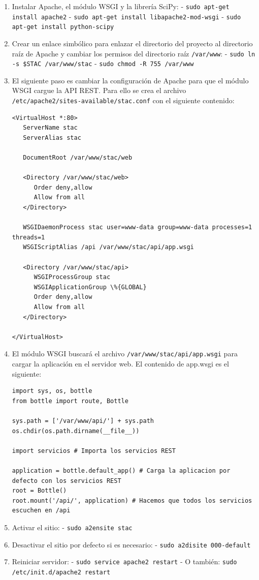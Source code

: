 \begin{enumerate}
\item Instalar Apache, el módulo WSGI y la librería SciPy:
\subitem - \texttt{sudo apt-get install apache2}
\subitem - \texttt{sudo apt-get install libapache2-mod-wsgi}
\subitem - \texttt{sudo apt-get install python-scipy}
\item Crear un enlace simbólico para enlazar el directorio del proyecto al directorio raíz de Apache y cambiar los permisos del directorio raíz \texttt{/var/www}:
\subitem - \texttt{sudo ln -s \$STAC /var/www/stac}
\subitem - \texttt{sudo chmod -R 755 /var/www}
\item El siguiente paso es cambiar la configuración de Apache para que el módulo WSGI cargue la API REST. Para ello se crea el archivo \texttt{/etc/apache2/sites-available/stac.conf} con el siguiente contenido:
\begin{lstlisting}
<VirtualHost *:80>
   ServerName stac
   ServerAlias stac
   
   DocumentRoot /var/www/stac/web
   
   <Directory /var/www/stac/web>
      Order deny,allow
      Allow from all
   </Directory>

   WSGIDaemonProcess stac user=www-data group=www-data processes=1 threads=1
   WSGIScriptAlias /api /var/www/stac/api/app.wsgi
   
   <Directory /var/www/stac/api>
      WSGIProcessGroup stac
      WSGIApplicationGroup \%{GLOBAL}
      Order deny,allow
      Allow from all
   </Directory>

</VirtualHost>
\end{lstlisting}
\item El módulo WSGI buscará el archivo \texttt{/var/www/stac/api/app.wsgi} para cargar la aplicación en el servidor web. El contenido de app.wsgi es el siguiente:
\begin{lstlisting}
import sys, os, bottle
from bottle import route, Bottle

sys.path = ['/var/www/api/'] + sys.path
os.chdir(os.path.dirname(__file__))

import servicios # Importa los servicios REST

application = bottle.default_app() # Carga la aplicacion por defecto con los servicios REST
root = Bottle()
root.mount('/api/', application) # Hacemos que todos los servicios escuchen en /api
\end{lstlisting}
\item Activar el sitio:
\subitem - \texttt{sudo a2ensite stac}
\item Desactivar el sitio por defecto si es necesario:
\subitem - \texttt{sudo a2disite 000-default}
\item Reiniciar servidor:
\subitem - \texttt{sudo service apache2 restart}
\subitem - O también: \texttt{sudo /etc/init.d/apache2 restart}
\end{enumerate}